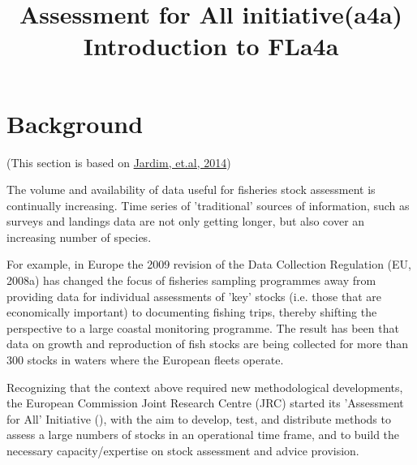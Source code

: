 \documentclass[a4paper,english,10pt]{article}\usepackage[]{graphicx}\usepackage[]{color}
\begin{document}
\title{Assessment for All initiative(a4a) \\ Introduction to FLa4a}



\maketitle
\tableofcontents
\newpage

\section{Background}

(This section is based on \href{http://icesjms.oxfordjournals.org/content/early/2014/04/03/icesjms.fsu050.abstract}{Jardim, et.al, 2014})

The volume and availability of data useful for fisheries stock assessment is continually increasing. Time series of 'traditional' sources of information, such as surveys and landings data are not only getting longer, but also cover an increasing number of species.

For example, in Europe the 2009 revision of the Data Collection Regulation (EU, 2008a) has changed the focus of fisheries sampling programmes away from providing data for individual assessments of 'key' stocks (i.e. those that are economically important) to documenting fishing trips, thereby shifting the perspective to a large coastal monitoring programme. The result has been that data on growth and reproduction of fish stocks are being collected for more than 300 stocks in waters where the European fleets operate.

Recognizing that the context above required new methodological developments, the European Commission Joint Research Centre (JRC) started its 'Assessment for All' Initiative (\aFa), with the aim to develop, test, and distribute methods to assess a large numbers of stocks in an operational time frame, and to build the necessary capacity/expertise on stock assessment and advice provision. 
\end{document}
